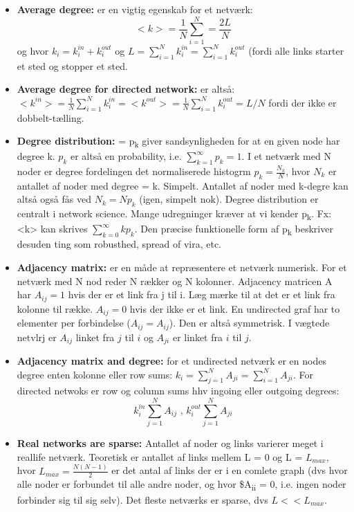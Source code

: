 \documentclass[11pt]{article}
\begin{document}
\begin{itemize}
\item \textbf{Average degree:} er en vigtig egenskab for et netværk: $$ <k> = \frac{1}{N} \sum^N_{i = 1} = \frac{2L}{N} $$ og hvor \(k_i = k^{in}_i + k^{out}_i\) og \(L = \sum^N_{i = 1} k^{in}_i = \sum^N_{i = 1} k^{out}_i\) (fordi alle links starter et sted og stopper et sted.

\item \textbf{Average degree for directed network:} er altså: \(<k^{in}> = \frac{1}{N} \sum^N_{i = 1} k^{in}_i = <k^{out}> = \frac{1}{N} \sum^N_{i = 1} k^{out}_i = L/N\) fordi der ikke er dobbelt-tælling.

\item \textbf{Degree distribution:} = p\textsubscript{k}  giver sandsynligheden for at en given node har degree k. \(p_k\) er altså en probability, i.e. \(\sum^\infty_{k=1} p_k = 1\). I et netværk med N noder er degree fordelingen det normaliserede histogrm \(p_k = \frac{N_k}{N}\), hvor \(N_k\) er antallet af noder med degree = k. Simpelt. Antallet af noder med k-degre kan altså også fås ved \(N_k = N p_k\) (igen, simpelt nok). Degree distribution er centralt i network science. Mange udregninger kræver at vi kender p\textsubscript{k}. Fx: <k> kan skrives \(\sum^{\infty}_{k = 0} k p_k\). Den præcise funktionelle form af p\textsubscript{k} beskriver desuden ting som robusthed, spread of vira, etc.

\item \textbf{Adjacency matrix:} er en måde at repræsentere et netværk numerisk. For et netværk med N nod reder N rækker og N kolonner. Adjacency matricen A har \(A_{ij} = 1\) hvis der er et link fra j til i. Læg mærke til at det er et link fra kolonne til række. \(A_{ij} = 0\) hvis der ikke er et link. En undirected graf har to elementer per forbindelse (\(A_{ij} = A_{ij}\)). Den er altså symmetrisk. I vægtede netvlrj er \(A_{ij}\) linket fra  \(j\) til \(i\) og \(A_{ji}\) er linket fra \(i\) til \(j\).

\item \textbf{Adjacency matrix and degree:} for et undirected netværk er en nodes degree enten kolonne eller row sums: \(k_i = \sum^{N}_{j = 1} A_{ji} = \sum^N_{i = 1} A_{ji}\). For directed netwoks er row og column sums hhv ingoing eller outgoing degrees: $$ k^{in}_i \sum^N_{j = 1} A_{ij} \text{ , } k^{out}_i \sum^N_{j=1} A_{ji} $$

\item \textbf{Real networks are sparse:} Antallet af noder og links varierer meget i reallife netværk. Teoretisk er antallet af links mellem L = 0 og L = \(L_{max}\), hvor \(L_{max} = \frac{N(N-1)}{2}\) er det antal af links der er i en comlete graph (dvs hvor alle noder er forbundet til alle andre noder, og hvor \$A\textsubscript{ii} = 0, i.e. ingen noder forbinder sig til sig selv). Det fleste netværks er sparse, dvs \(L << L_{max}\).


\end{itemize}
\end{document}
